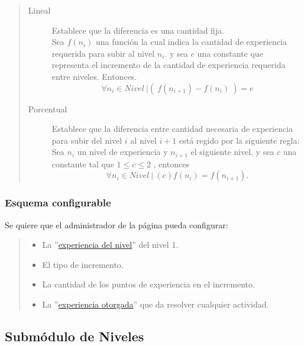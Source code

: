     \begin{quote}
    \begin{description}
        \item[Lineal] Establece que la diferencia es una cantidad fija.\\
        Sea $f(n_i)$ una función la cual indica la cantidad de experiencia requerida para subir al nivel $n_i$. y sea $e$ una constante que representa el incremento de la cantidad de experiencia requerida entre niveles. Entonces.
            $$\forall n_i \in Nivel\ | \left(\ f(n_{i+1}) - f(n_i)\ \right) = e$$

        \item[Porcentual] Establece que la diferencia entre cantidad necesaria de experiencia para subir del nivel $i$ al nivel $i+1$ está regido por la siguiente regla:\\
        Sea $n_i$ un nivel de experiencia y $n_{i+1}$ el siguiente nivel, y sea $c$ una constante tal que $1 \leq c \leq 2$ , entonces
            $$\forall n_i \in Nivel\ |\ (c)f(n_i) = f(n_{i+1}).$$
    \end{description}
    \end{quote}

\subsubsection{Esquema configurable}

 Se quiere que el administrador de la página pueda configurar:
 \begin{quote}
 \begin{itemize}
    \item{La ''\hyperref[table:METerminosExperiencia1]{experiencia del nivel}'' del nivel 1.}
    \item {El tipo de incremento.}
    \item {La cantidad de los puntos de experiencia en el incremento.}
    \item {La ''\hyperref[table:METerminosExperiencia1]{experiencia otorgada}'' que da resolver cualquier actividad.}
 \end{itemize}
 \end{quote}

\subsection{Submódulo de Niveles}


